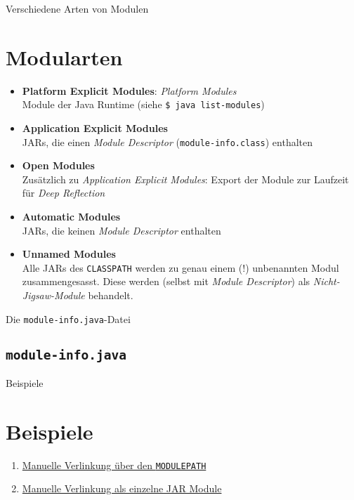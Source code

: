 \documentclass[aspectratio=169,x11names,11pt]{beamer}
\begin{document}
\begin{frame}{Verschiedene Arten von Modulen}
\section{Modularten}
\begin{itemize}
	\item \textbf{Platform Explicit Modules}: \textit{Platform Modules}\\
	Module der Java Runtime (siehe \texttt{\$ java \text{-}\text{-}list-modules})
	\item \textbf{Application Explicit Modules}\\
	JARs, die einen \textit{Module Descriptor} (\texttt{module-info.class}) enthalten
	\item \textbf{Open Modules}\\
	Zusätzlich zu \textit{Application Explicit Modules}: Export der Module zur Laufzeit für \textit{Deep Reflection}
	\item \textbf{Automatic Modules}\\
	JARs, die keinen \textit{Module Descriptor} enthalten
	\item \textbf{Unnamed Modules}\\
	Alle JARs des \texttt{CLASSPATH} werden zu genau einem (!) unbenannten Modul zusammengesasst. Diese werden (selbst mit \textit{Module Descriptor}) als \textit{Nicht-Jigsaw-Module} behandelt.
\end{itemize}
\end{frame}

\begin{frame}{Die \texttt{module-info.java}-Datei}
\subsection{\texttt{module-info.java}}

\end{frame}

\newcommand{\bspeins}{Manuelle Verlinkung über den \texttt{MODULEPATH}}
\newcommand{\bspzwei}{Manuelle Verlinkung als einzelne JAR Module}

\begin{frame}{Beispiele}
\section{Beispiele}
\begin{enumerate}
	\item \hyperref[bsp1]{\bspeins}
	\item \hyperref[bsp2]{\bspzwei}
\end{enumerate}
\end{frame}
\end{document}
